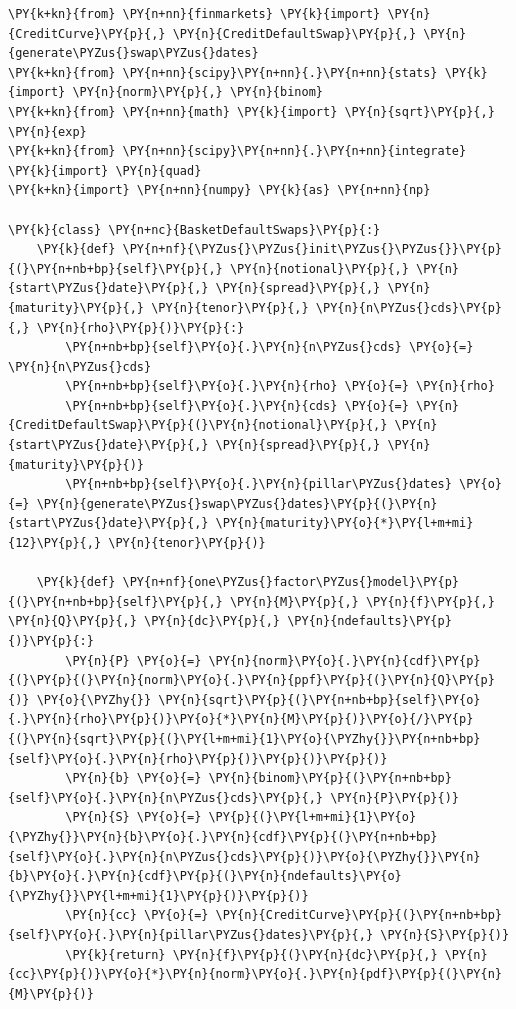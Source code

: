 \begin{tcolorbox}[breakable, size=fbox, boxrule=1pt, pad at break*=1mm,colback=cellbackground, colframe=cellborder]
\begin{Verbatim}[commandchars=\\\{\}]
\PY{k+kn}{from} \PY{n+nn}{finmarkets} \PY{k}{import} \PY{n}{CreditCurve}\PY{p}{,} \PY{n}{CreditDefaultSwap}\PY{p}{,} \PY{n}{generate\PYZus{}swap\PYZus{}dates}
\PY{k+kn}{from} \PY{n+nn}{scipy}\PY{n+nn}{.}\PY{n+nn}{stats} \PY{k}{import} \PY{n}{norm}\PY{p}{,} \PY{n}{binom}
\PY{k+kn}{from} \PY{n+nn}{math} \PY{k}{import} \PY{n}{sqrt}\PY{p}{,} \PY{n}{exp}
\PY{k+kn}{from} \PY{n+nn}{scipy}\PY{n+nn}{.}\PY{n+nn}{integrate} \PY{k}{import} \PY{n}{quad}
\PY{k+kn}{import} \PY{n+nn}{numpy} \PY{k}{as} \PY{n+nn}{np}
		
\PY{k}{class} \PY{n+nc}{BasketDefaultSwaps}\PY{p}{:}
    \PY{k}{def} \PY{n+nf}{\PYZus{}\PYZus{}init\PYZus{}\PYZus{}}\PY{p}{(}\PY{n+nb+bp}{self}\PY{p}{,} \PY{n}{notional}\PY{p}{,} \PY{n}{start\PYZus{}date}\PY{p}{,} \PY{n}{spread}\PY{p}{,} \PY{n}{maturity}\PY{p}{,} \PY{n}{tenor}\PY{p}{,} \PY{n}{n\PYZus{}cds}\PY{p}{,} \PY{n}{rho}\PY{p}{)}\PY{p}{:}
        \PY{n+nb+bp}{self}\PY{o}{.}\PY{n}{n\PYZus{}cds} \PY{o}{=} \PY{n}{n\PYZus{}cds}
        \PY{n+nb+bp}{self}\PY{o}{.}\PY{n}{rho} \PY{o}{=} \PY{n}{rho}
        \PY{n+nb+bp}{self}\PY{o}{.}\PY{n}{cds} \PY{o}{=} \PY{n}{CreditDefaultSwap}\PY{p}{(}\PY{n}{notional}\PY{p}{,} \PY{n}{start\PYZus{}date}\PY{p}{,} \PY{n}{spread}\PY{p}{,} \PY{n}{maturity}\PY{p}{)}
        \PY{n+nb+bp}{self}\PY{o}{.}\PY{n}{pillar\PYZus{}dates} \PY{o}{=} \PY{n}{generate\PYZus{}swap\PYZus{}dates}\PY{p}{(}\PY{n}{start\PYZus{}date}\PY{p}{,} \PY{n}{maturity}\PY{o}{*}\PY{l+m+mi}{12}\PY{p}{,} \PY{n}{tenor}\PY{p}{)} 
		
    \PY{k}{def} \PY{n+nf}{one\PYZus{}factor\PYZus{}model}\PY{p}{(}\PY{n+nb+bp}{self}\PY{p}{,} \PY{n}{M}\PY{p}{,} \PY{n}{f}\PY{p}{,} \PY{n}{Q}\PY{p}{,} \PY{n}{dc}\PY{p}{,} \PY{n}{ndefaults}\PY{p}{)}\PY{p}{:}
        \PY{n}{P} \PY{o}{=} \PY{n}{norm}\PY{o}{.}\PY{n}{cdf}\PY{p}{(}\PY{p}{(}\PY{n}{norm}\PY{o}{.}\PY{n}{ppf}\PY{p}{(}\PY{n}{Q}\PY{p}{)} \PY{o}{\PYZhy{}} \PY{n}{sqrt}\PY{p}{(}\PY{n+nb+bp}{self}\PY{o}{.}\PY{n}{rho}\PY{p}{)}\PY{o}{*}\PY{n}{M}\PY{p}{)}\PY{o}{/}\PY{p}{(}\PY{n}{sqrt}\PY{p}{(}\PY{l+m+mi}{1}\PY{o}{\PYZhy{}}\PY{n+nb+bp}{self}\PY{o}{.}\PY{n}{rho}\PY{p}{)}\PY{p}{)}\PY{p}{)}
        \PY{n}{b} \PY{o}{=} \PY{n}{binom}\PY{p}{(}\PY{n+nb+bp}{self}\PY{o}{.}\PY{n}{n\PYZus{}cds}\PY{p}{,} \PY{n}{P}\PY{p}{)}
        \PY{n}{S} \PY{o}{=} \PY{p}{(}\PY{l+m+mi}{1}\PY{o}{\PYZhy{}}\PY{n}{b}\PY{o}{.}\PY{n}{cdf}\PY{p}{(}\PY{n+nb+bp}{self}\PY{o}{.}\PY{n}{n\PYZus{}cds}\PY{p}{)}\PY{o}{\PYZhy{}}\PY{n}{b}\PY{o}{.}\PY{n}{cdf}\PY{p}{(}\PY{n}{ndefaults}\PY{o}{\PYZhy{}}\PY{l+m+mi}{1}\PY{p}{)}\PY{p}{)}
        \PY{n}{cc} \PY{o}{=} \PY{n}{CreditCurve}\PY{p}{(}\PY{n+nb+bp}{self}\PY{o}{.}\PY{n}{pillar\PYZus{}dates}\PY{p}{,} \PY{n}{S}\PY{p}{)}
        \PY{k}{return} \PY{n}{f}\PY{p}{(}\PY{n}{dc}\PY{p}{,} \PY{n}{cc}\PY{p}{)}\PY{o}{*}\PY{n}{norm}\PY{o}{.}\PY{n}{pdf}\PY{p}{(}\PY{n}{M}\PY{p}{)}
		

\end{Verbatim}
\end{tcolorbox}
